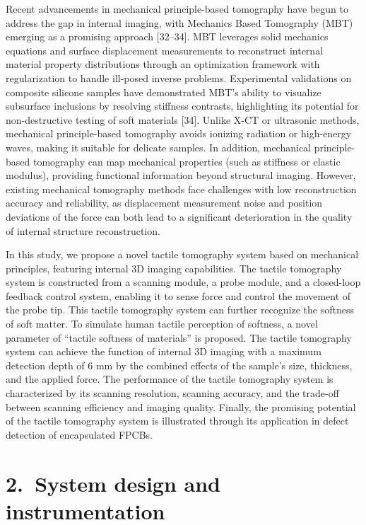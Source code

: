 \documentclass[11pt]{article}
\begin{document}
Recent advancements in mechanical principle-based tomography have
begun to address the gap in internal imaging, with Mechanics Based
Tomography (MBT) emerging as a promising approach [32--34]. MBT
leverages solid mechanics equations and surface displacement
measurements to reconstruct internal material property distributions
through an optimization framework with regularization to handle
ill-posed inverse problems. Experimental validations on composite
silicone samples have demonstrated MBT's ability to visualize
subsurface inclusions by resolving stiffness contrasts, highlighting
its potential for non-destructive testing of soft materials [34].
Unlike X-CT or ultrasonic methods, mechanical principle-based
tomography avoids ionizing radiation or high-energy waves, making
it suitable for delicate samples. In addition, mechanical
principle-based tomography can map mechanical properties (such as
stiffness or elastic modulus), providing functional information
beyond structural imaging. However, existing mechanical tomography
methods face challenges with low reconstruction accuracy and
reliability, as displacement measurement noise and position
deviations of the force can both lead to a significant deterioration
in the quality of internal structure reconstruction.

In this study, we propose a novel tactile tomography system based
on mechanical principles, featuring internal 3D imaging
capabilities. The tactile tomography system is constructed from a
scanning module, a probe module, and a closed-loop feedback control
system, enabling it to sense force and control the movement of the
probe tip. This tactile tomography system can further recognize the
softness of soft matter. To simulate human tactile perception of
softness, a novel parameter of ``tactile softness of materials'' is
proposed. The tactile tomography system can achieve the function of
internal 3D imaging with a maximum detection depth of 6 mm by the
combined effects of the sample's size, thickness, and the applied
force. The performance of the tactile tomography system is
characterized by its scanning resolution, scanning accuracy, and the
trade-off between scanning efficiency and imaging quality. Finally,
the promising potential of the tactile tomography system is
illustrated through its application in defect detection of
encapsulated FPCBs.

\section*{2.\ System design and instrumentation}
\end{document}
